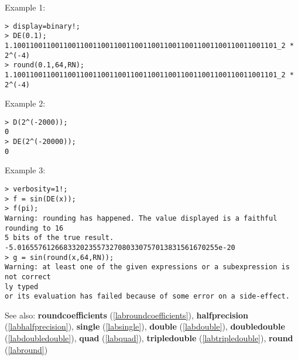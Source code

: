 \noindent Example 1: 
\begin{center}\begin{minipage}{15cm}\begin{Verbatim}[frame=single,commandchars=\\\|\~]
> display=binary!;
> DE(0.1);
1.100110011001100110011001100110011001100110011001100110011001101_2 * 2^(-4)
> round(0.1,64,RN);
1.100110011001100110011001100110011001100110011001100110011001101_2 * 2^(-4)
\end{Verbatim}
\end{minipage}\end{center}
\noindent Example 2: 
\begin{center}\begin{minipage}{15cm}\begin{Verbatim}[frame=single,commandchars=\\\|\~]
> D(2^(-2000));
0
> DE(2^(-20000));
0
\end{Verbatim}
\end{minipage}\end{center}
\noindent Example 3: 
\begin{center}\begin{minipage}{15cm}\begin{Verbatim}[frame=single,commandchars=\\\|\~]
> verbosity=1!;
> f = sin(DE(x));
> f(pi);
Warning: rounding has happened. The value displayed is a faithful rounding to 16
5 bits of the true result.
-5.016557612668332023557327080330757013831561670255e-20
> g = sin(round(x,64,RN));
Warning: at least one of the given expressions or a subexpression is not correct
ly typed
or its evaluation has failed because of some error on a side-effect.
\end{Verbatim}
\end{minipage}\end{center}
See also: \textbf{roundcoefficients} (\ref{labroundcoefficients}), \textbf{halfprecision} (\ref{labhalfprecision}), \textbf{single} (\ref{labsingle}), \textbf{double} (\ref{labdouble}), \textbf{doubledouble} (\ref{labdoubledouble}), \textbf{quad} (\ref{labquad}), \textbf{tripledouble} (\ref{labtripledouble}), \textbf{round} (\ref{labround})
